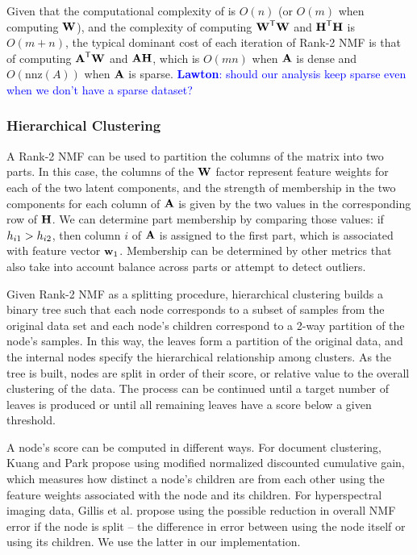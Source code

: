 \documentclass[conference,compsoc]{IEEEtran}
\newcommand{\LM}[1]{\textcolor{blue}{\textbf{Lawton}: #1}}
\begin{document}
Given that the computational complexity of  is $O(n)$ (or $O(m)$ when computing $\M{W}$), and the complexity of computing $\M{W}^\Tra\M{W}$ and $\M{H}^\Tra\M{H}$ is $O(m+n)$, the typical dominant cost of each iteration of Rank-2 NMF is that of computing $\M{A}^\Tra\M{W}$ and $\M{A}\M{H}$, which is $O(mn)$ when $\M{A}$ is dense and $O(\text{nnz}(A))$ when $\M{A}$ is sparse.
\LM{should our analysis keep sparse even when we don't have a sparse dataset?}

\subsubsection{Hierarchical Clustering}

A Rank-2 NMF can be used to partition the columns of the matrix into two parts.
In this case, the columns of the $\M{W}$ factor represent feature weights for each of the two latent components, and the strength of membership in the two components for each column of $\M{A}$ is given by the two values in the corresponding row of $\M{H}$.
We can determine part membership by comparing those values: if $\ME{H}{i1} > \ME{H}{i2}$, then column $i$ of $\M{A}$ is assigned to the first part, which is associated with feature vector $\V{w}_1$.
Membership can be determined by other metrics that also take into account balance across parts or attempt to detect outliers.

Given Rank-2 NMF as a splitting procedure, hierarchical clustering builds a binary tree such that each node corresponds to a subset of samples from the original data set and each node's children correspond to a 2-way partition of the node's samples.
In this way, the leaves form a partition of the original data, and the internal nodes specify the hierarchical relationship among clusters.
As the tree is built, nodes are split in order of their score, or relative value to the overall clustering of the data.
The process can be continued until a target number of leaves is produced or until all remaining leaves have a score below a given threshold.

A node's score can be computed in different ways.
For document clustering, Kuang and Park \cite{KP13} propose using modified normalized discounted cumulative gain, which measures how distinct a node's children are from each other using the feature weights associated with the node and its children.
For hyperspectral imaging data, Gillis et al. \cite{GKP15} propose using the possible reduction in overall NMF error if the node is split -- the difference in error between using the node itself or using its children.
We use the latter in our implementation.
\end{document}
